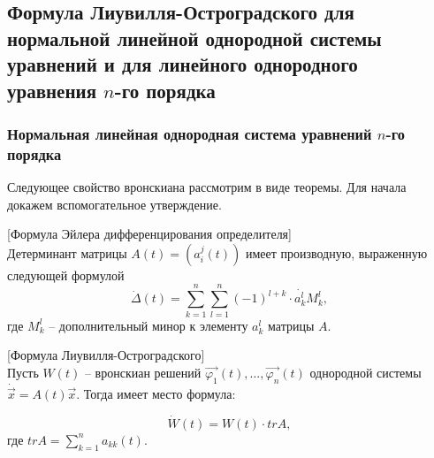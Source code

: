 \subsection{Формула Лиувилля-Остроградского для нормальной линейной однородной системы уравнений и для линейного однородного уравнения $n$-го порядка}

\subsubsection{Нормальная линейная однородная система уравнений $n$-го порядка}

Следующее свойство вронскиана рассмотрим в виде теоремы. Для начала докажем вспомогательное утверждение.

\begin{lemma}

[Формула Эйлера дифференцирования определителя]\\
Детерминант матрицы $A(t) = (a_i^j(t))$ имеет производную, выраженную следующей формулой
\[\dot{\Delta}(t) = \sum\limits_{k = 1}^n{\sum\limits_{l = 1}^n{(-1)^{l + k} \cdot \dot{a_k^l}}M_k^l},\]
где $M_k^l$ -- дополнительный минор к элементу $a_k^l$ матрицы $A$.

\end{lemma}

\begin{theorem}

[Формула Лиувилля-Остроградского]\\
Пусть $W(t)$ -- вронскиан решений $\overrightarrow{\varphi_1}(t), ..., \overrightarrow{\varphi_n}(t)$ однородной системы $\dot{\overrightarrow{x}} = A(t) \overrightarrow{x}$. Тогда имеет место формула:

\[\dot{W}(t) = W(t) \cdot trA,\]
где $trA = \sum\limits_{k = 1}^n{a_{kk}(t)}$.

\end{theorem}

